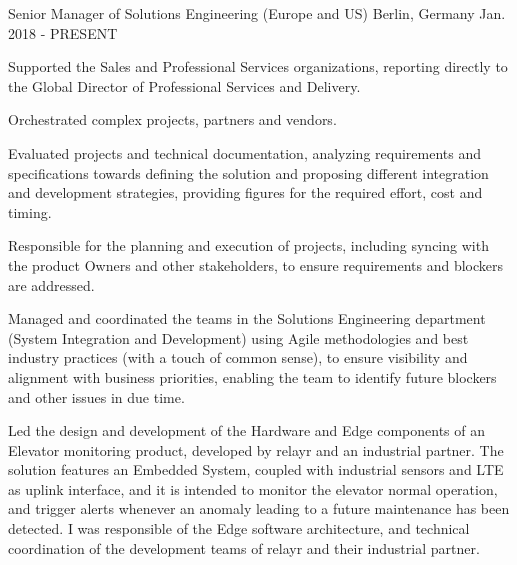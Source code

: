 



\begin{cventries}

  \cventry
    {Senior Manager of Solutions Engineering (Europe and US)} %
    {} %
    {Berlin, Germany} %
    {Jan. 2018 - PRESENT} %
    {
      \begin{cvitems} %
        \item {Supported the Sales and Professional Services organizations, reporting directly to the Global Director of Professional Services and Delivery.}
        \item {Orchestrated complex projects, partners and vendors.}
        \item {Evaluated projects and technical documentation, analyzing requirements and specifications towards defining the solution and proposing different integration and development strategies, providing figures for the required effort, cost and timing.}
        \item {Responsible for the planning and execution of projects, including syncing with the product Owners and other stakeholders, to ensure requirements and blockers are addressed.}
        \item {Managed and coordinated the teams in the Solutions Engineering department (System Integration and Development) using Agile methodologies and best industry practices (with a touch of common sense), to ensure visibility and alignment with business priorities, enabling the team to identify future blockers and other issues in due time.}
        \item {Led the design and development of the Hardware and Edge components of an Elevator monitoring product, developed by relayr and an industrial partner.  The solution features an Embedded System, coupled with industrial sensors and LTE as uplink interface, and it is intended to monitor the elevator normal operation, and trigger alerts whenever an anomaly leading to a future maintenance has been detected.  I was responsible of the Edge software architecture, and technical coordination of the development teams of relayr and their industrial partner.}

\end{cvitems}}
\end{cventries}
